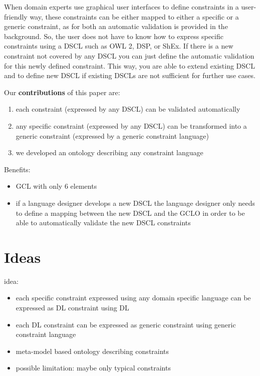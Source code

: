 \documentclass{llncs}
\begin{document}
When domain experts use graphical user interfaces to define constraints in a user-friendly way, 
these constraints can be either mapped to either a specific or a generic constraint, as for both an automatic validation is provided in the background.    
So, the user does not have to know how to express specific constraints using a DSCL such as OWL 2, DSP, or ShEx.
If there is a new constraint not covered by any DSCL you can just define the automatic validation for this newly defined constraint.
This way, you are able to extend existing DSCL and to define new DSCL if existing DSCLs are not sufficient for further use cases.

Our \textbf{contributions} of this paper are:
\begin{enumerate}
	\item each constraint (expressed by any DSCL) can be validated automatically
	\item any specific constraint (expressed by any DSCL) can be transformed into a generic constraint (expressed by a generic constraint language)
	\item we developed an ontology describing any constraint language
\end{enumerate}

Benefits:
\begin{itemize}
	\item GCL with only 6 elements
	\item if a language designer develops a new DSCL the language designer only needs to define a mapping between the new DSCL and the GCLO 
	in order to be able to automatically validate the new DSCL constraints
\end{itemize}

\section{Ideas}

idea:
\begin{itemize}
	\item each specific constraint expressed using any domain specific language can be expressed as DL constraint using DL
	\item each DL constraint can be expressed as generic constraint using generic constraint language
	\item meta-model based ontology describing constraints
	\item possible limitation: maybe only typical constraints
\end{itemize}
\end{document}

